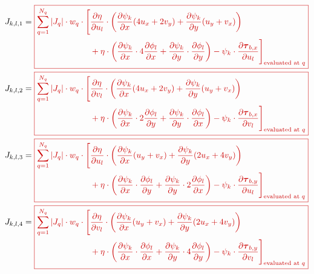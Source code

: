 \documentclass{amsart}
\newcommand{\diff}[2]{\ensuremath{\frac{\partial #1}{\partial #2}}}
\newcommand{\sumQ}{\ensuremath{\sum_{q = 1}^{N_q}}}
\newcommand{\basalshearstress}[1]{\boldsymbol{\tau}_{b#1}}
\newcommand{\taubx}{\basalshearstress{,x}}
\newcommand{\tauby}{\basalshearstress{,y}}
\newcommand{\highlight}[1]{{\color{red!80!black} \fbox{$ \displaystyle #1 $} }}
\begin{document}
\begin{align}
  J_{k,l,1} &= \highlight{
              \begin{aligned}[t]
                \sumQ |J_q| \cdot w_q\cdot \Bigg[&\diff{\eta}{u_l}\cdot
                \left( \diff{\psi_k}{x} (4 u_x + 2 v_y) + \diff{\psi_k}{y} (u_y + v_x) \right)\\
                & + \eta\cdot \left( \diff{\psi_k}{x}\cdot 4 \diff{\phi_l}{x} + \diff{\psi_k}{y}\cdot \diff{\phi_l}{y} \right)
                - \psi_k\cdot \diff{\taubx}{u_l} \Bigg]_{\text{evaluated at } q}\\
              \end{aligned} }\\
  J_{k,l,2} &= \highlight{
              \begin{aligned}[t]
                \sumQ |J_q| \cdot w_q\cdot \Bigg[&\diff{\eta}{v_l}\cdot
                \left( \diff{\psi_k}{x} (4 u_x + 2 v_y) + \diff{\psi_k}{y} (u_y + v_x) \right)\\
                & + \eta\cdot \left( \diff{\psi_k}{x}\cdot 2 \diff{\phi_l}{y} + \diff{\psi_k}{y}\cdot \diff{\phi_l}{x} \right)
                - \psi_k\cdot \diff{\taubx}{v_l} \Bigg]_{\text{evaluated at } q}\\
              \end{aligned} }\\
  J_{k,l,3} &= \highlight{
              \begin{aligned}[t]
                \sumQ |J_q| \cdot w_q\cdot \Bigg[&\diff{\eta}{u_l}\cdot
                \left( \diff{\psi_k}{x} (u_y + v_x) + \diff{\psi_k}{y} (2 u_x + 4 v_y) \right)\\
                & + \eta\cdot \left( \diff{\psi_k}{x}\cdot \diff{\phi_l}{y} + \diff{\psi_k}{y}\cdot 2 \diff{\phi_l}{x} \right)
                - \psi_k\cdot \diff{\tauby}{u_l} \Bigg]_{\text{evaluated at } q}\\
              \end{aligned} }\\
  J_{k,l,4} &= \highlight{
              \begin{aligned}[t]
                \sumQ |J_q| \cdot w_q\cdot \Bigg[&\diff{\eta}{v_l}\cdot
                \left( \diff{\psi_k}{x} (u_y + v_x) + \diff{\psi_k}{y} (2 u_x + 4 v_y) \right)\\
                & + \eta\cdot \left( \diff{\psi_k}{x}\cdot \diff{\phi_l}{x} + \diff{\psi_k}{y}\cdot 4 \diff{\phi_l}{y} \right)
                - \psi_k\cdot \diff{\tauby}{v_l} \Bigg]_{\text{evaluated at } q}\\
              \end{aligned} }
\end{align}
\end{document}
